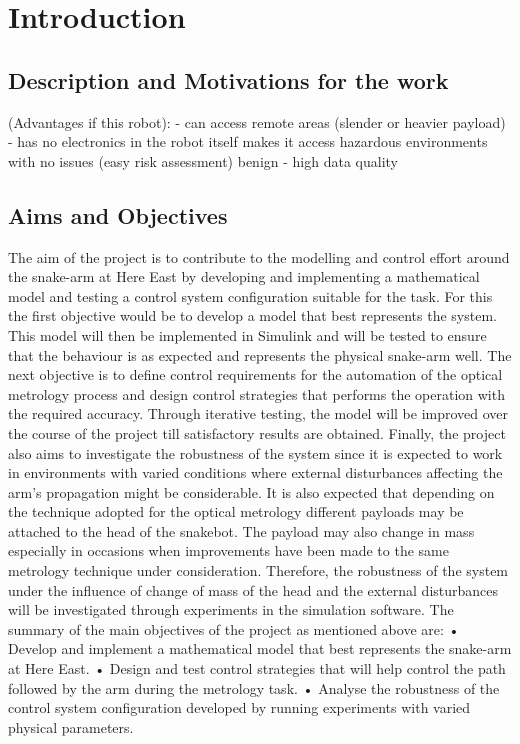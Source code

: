 \documentclass[a4paper,12pt]{report}
\begin{document}
\pagebreak

\tableofcontents

\pagebreak

\begin{abstract}
    \ldots
\end{abstract}

\chapter{Introduction}
\section{Description and Motivations for the work}
(Advantages if this robot):
- can access remote areas (slender or heavier payload)
- has no electronics in the robot itself makes it access hazardous environments with no issues (easy risk assessment) benign 
- high data quality 
\section{Aims and Objectives}
The aim of the project is to contribute to the modelling and control effort around the snake-arm at Here East by developing and implementing a mathematical model and testing a control system configuration suitable for the task.
For this the first objective would be to develop a model that best represents the system. This model will then be implemented in Simulink and will be tested to ensure that the behaviour is as expected and represents the physical snake-arm well. 
The next objective is to define control requirements for the automation of the optical metrology process and design control strategies that performs the operation with the required accuracy. Through iterative testing, the model will be improved over the course of the project till satisfactory results are obtained.
Finally, the project also aims to investigate the robustness of the system since it is expected to work in environments with varied conditions where external disturbances affecting the arm’s propagation might be considerable. It is also expected that depending on the technique adopted for the optical metrology different payloads may be attached to the head of the snakebot. The payload may also change in mass especially in occasions when improvements have been made to the same metrology technique under consideration. Therefore, the robustness of the system under the influence of change of mass of the head and the external disturbances will be investigated through experiments in the simulation software.
The summary of the main objectives of the project as mentioned above are:
•	Develop and implement a mathematical model that best represents the snake-arm at Here East.
•	Design and test control strategies that will help control the path followed by the arm during the metrology task.
•	Analyse the robustness of the control system configuration developed by running experiments with varied physical parameters.
\end{document}
